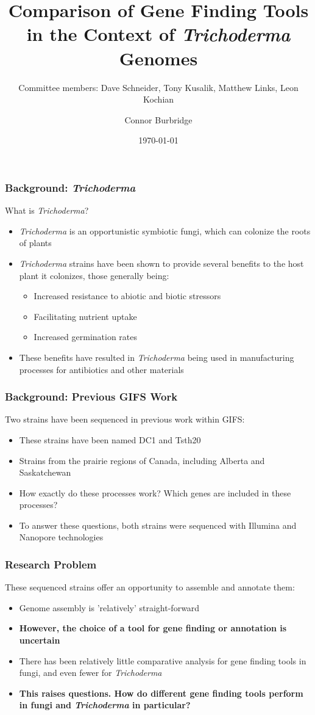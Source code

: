 \documentclass{beamer}
\title{Comparison of Gene Finding Tools in the Context of \textit{Trichoderma} Genomes}
\subtitle{Committee members: Dave Schneider, Tony Kusalik, Matthew Links, Leon Kochian}
\author{Connor Burbridge}
\date{\today}
\begin{document}
\begin{frame}
  \titlepage
\end{frame}

\begin{frame}
  \frametitle{Background: \textit{Trichoderma}}
  What is \textit{Trichoderma}?
  \begin{itemize}
  \item \textit{Trichoderma} is an opportunistic symbiotic fungi, which
    can colonize the roots of plants
  \item \textit{Trichoderma} strains have been shown to provide
    several benefits to the host plant it colonizes, those generally
    being:
    \begin{itemize}
      \item Increased resistance to abiotic and biotic stressors
      \item Facilitating nutrient uptake
      \item Increased germination rates
    \end{itemize}
  \item These benefits have resulted in \textit{Trichoderma} being
    used in manufacturing processes for antibiotics and other materials
  \end{itemize}
\end{frame}

\begin{frame}
  \frametitle{Background: Previous GIFS Work}
  Two strains have been sequenced in previous work within GIFS:
  \begin{itemize}
  \item These strains have been named DC1 and Tsth20
  \item Strains from the prairie regions of Canada, including Alberta
    and Saskatchewan
  \item How exactly do these processes work? Which genes are included
    in these processes?
  \item To answer these questions, both strains were sequenced with
    Illumina and Nanopore technologies
  \end{itemize}
\end{frame}

\begin{frame}
  \frametitle{Research Problem} These sequenced strains offer an
  opportunity to assemble and annotate them:
  \begin{itemize}
  \item Genome assembly is 'relatively' straight-forward
  \item \textbf{However, the choice of a tool for gene finding or
    annotation is uncertain}
  \item There has been relatively little comparative analysis for gene
    finding tools in fungi, and even fewer for \textit{Trichoderma}
  \item \textbf{This raises questions. How do different gene finding
    tools perform in fungi and \textit{Trichoderma} in particular?}
  \end{itemize}
\end{frame}
\end{document}

